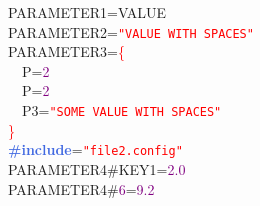 \noindent
\mbox{}PARAMETER1\textcolor{BrickRed}{=}VALUE \\
\mbox{}PARAMETER2\textcolor{BrickRed}{=}\texttt{\textcolor{Red}{"{}VALUE\ WITH\ SPACES"{}}} \\
\mbox{}PARAMETER3\textcolor{BrickRed}{=}\textcolor{Red}{\{} \\
\mbox{}\ \ P\textcolor{BrickRed}{=}\textcolor{Purple}{2} \\
\mbox{}\ \ P\textcolor{BrickRed}{=}\textcolor{Purple}{2} \\
\mbox{}\ \ P3\textcolor{BrickRed}{=}\texttt{\textcolor{Red}{"{}SOME\ VALUE\ WITH\ SPACES"{}}} \\
\mbox{}\textcolor{Red}{\}} \\
\mbox{}\textbf{\textcolor{RoyalBlue}{\#include}}=\texttt{\textcolor{Red}{"{}file2.config"{}}} \\
\mbox{}PARAMETER4\#KEY1\textcolor{BrickRed}{=}\textcolor{Purple}{2.0} \\
\mbox{}PARAMETER4\#\textcolor{Purple}{6}\textcolor{BrickRed}{=}\textcolor{Purple}{9.2}
